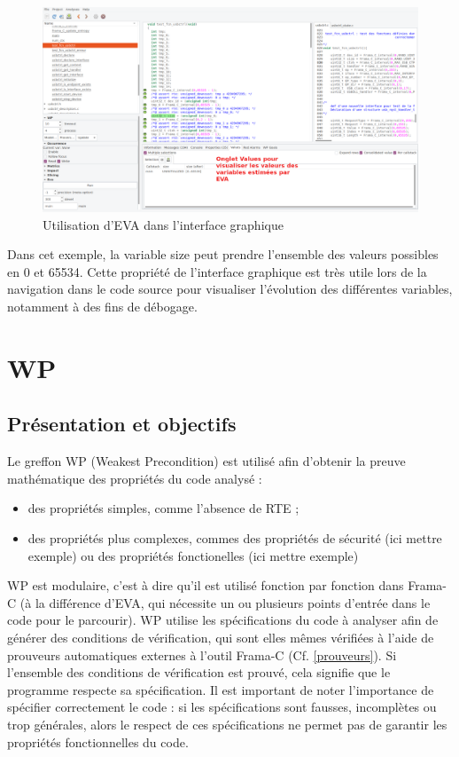 \begin{figure}[!h]
\centering
\includegraphics[width=16cm]{images/interface_EVA_gimp.png}
\caption{Utilisation d'EVA dans l'interface graphique}
\label{Utilisation d'EVA dans l'interface graphique}
\end{figure}

\newpage

Dans cet exemple, la variable size peut prendre l'ensemble des valeurs possibles en 0 et 65534.
Cette propriété de l'interface graphique est très utile lors de la navigation dans le code source pour visualiser l'évolution des différentes variables, notamment à des fins de débogage.

\section{WP}\label{WP}

\subsection{Présentation et objectifs}

Le greffon WP (Weakest Precondition) est utilisé afin d'obtenir la preuve mathématique des propriétés du code analysé :
\begin{itemize}
	\item des propriétés simples, comme l'absence de RTE ;
	\item des propriétés plus complexes, commes des propriétés de sécurité (ici mettre exemple) ou des propriétés fonctionelles (ici mettre exemple)
\end{itemize}
WP est modulaire, c'est à dire qu'il est utilisé fonction par fonction dans Frama-C (à la différence d'EVA, qui nécessite un ou plusieurs points d'entrée dans le code pour le parcourir). WP utilise les spécifications du code à analyser afin de générer des conditions de vérification, qui sont elles mêmes vérifiées à l'aide de prouveurs automatiques externes à l'outil Frama-C (Cf. \ref{prouveurs}). Si l'ensemble des conditions de vérification est prouvé, cela signifie que le programme respecte sa spécification. Il est important de noter l'importance de spécifier correctement le code : si les spécifications sont fausses, incomplètes ou trop générales, alors le respect de ces spécifications ne permet pas de garantir les propriétés fonctionnelles du code.

